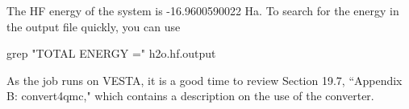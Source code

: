 The HF energy of the
system is -16.9600590022 Ha. To search for the energy in the output file quickly, you can
use 
\begin{shade}
grep "TOTAL ENERGY =" h2o.hf.output
\end{shade}
As the job runs on VESTA, it is a good time to review Section 19.7, ``Appendix B: convert4qmc," which contains a description on the use of the converter.


